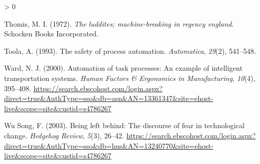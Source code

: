 \documentclass[
  english,
  man]{apa7}
\newlength{\cslhangindent}
\newenvironment{CSLReferences}[2] %
 {%
  \setlength{\parindent}{0pt}
  \ifodd #1 \everypar{\setlength{\hangindent}{\cslhangindent}}\ignorespaces\fi
  \ifnum #2 > 0
  \setlength{\parskip}{#2\baselineskip}
  \fi
 }%
 {}
\begin{document}
\begin{CSLReferences}{1}{0}
\leavevmode\hypertarget{ref-thomis1972luddites}{}%
Thomis, M. I. (1972). \emph{The luddites; machine-breaking in regency england}. Schocken Books Incorporated.

\leavevmode\hypertarget{ref-toola1993safety}{}%
Toola, A. (1993). The safety of process automation. \emph{Automatica}, \emph{29}(2), 541--548.

\leavevmode\hypertarget{ref-1336134720000101}{}%
Ward, N. J. (2000). Automation of task processes: An example of intelligent transportation systems. \emph{Human Factors \& Ergonomics in Manufacturing}, \emph{10}(4), 395--408. \url{https://search.ebscohost.com/login.aspx?direct=true\&AuthType=sso\&db=asn\&AN=13361347\&site=ehost-live\&scope=site\&custid=s4786267}

\leavevmode\hypertarget{ref-1324077020030101}{}%
Wu Song, F. (2003). Being left behind: The discourse of fear in technological change. \emph{Hedgehog Review}, \emph{5}(3), 26--42. \url{https://search.ebscohost.com/login.aspx?direct=true\&AuthType=sso\&db=hus\&AN=13240770\&site=ehost-live\&scope=site\&custid=s4786267}

\end{CSLReferences}

\endgroup
\end{document}
